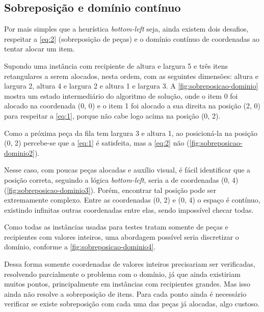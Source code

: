 \subsection{Sobreposição e domínio contínuo}\label{subsec:sobreposicao-e-dominio-infinito}

Por mais simples que a heurística \textit{bottom-left} seja, ainda existem dois desafios,
respeitar a \autoref{eq:2} (sobreposição de peças) e o domínio contínuo de coordenadas
ao tentar alocar um item.

Supondo uma instância com recipiente de altura e largura 5 e três itens retangulares a serem
alocados, nesta ordem, com as seguintes dimensões: altura e largura 2, altura 4 e largura 2 e
altura 1 e largura 3.
A \autoref{fig:sobreposicao-dominio} mostra um estado intermediário do algoritmo de solução, onde o
item 0 foi alocado na coordenada (0, 0) e o item 1 foi alocado a sua direita na posição (2, 0)
para respeitar a \autoref{eq:1}, porque não cabe logo acima na posição (0, 2).




Como a próxima peça da fila tem largura 3 e altura 1, ao posicioná-la na posição (0, 2)
percebe-se que a \autoref{eq:1} é satisfeita, mas a \autoref{eq:2} não (\autoref{fig:sobreposicao-dominio2}).



Nesse caso, com poucas peças alocadas e auxílio visual, é fácil identificar que a posição correta,
seguindo a lógica \textit{bottom-left}, seria a de coordenadas (0, 4)
(\autoref{fig:sobreposicao-dominio3}).
Porém, encontrar tal posição pode ser extremamente complexo.
Entre as coordenadas (0, 2) e (0, 4) o espaço é contínuo, existindo infinitas outras coordenadas
entre elas, sendo impossível checar todas.



Como todas as instâncias usadas para testes tratam somente de peças e recipientes com valores
inteiros, uma abordagem possível seria discretizar o domínio, conforme a
\autoref{fig:sobreposicao-dominio4}.



Dessa forma somente coordenadas de valores inteiros precisariam ser verificadas, resolvendo
parcialmente o problema com o domínio, já que ainda existiriam muitos pontos, principalmente em
instâncias com recipientes grandes.
Mas isso ainda não resolve a sobreposição de itens.
Para cada ponto ainda é necessário verificar se existe sobreposição com cada uma das peças já
alocadas, algo custoso.

